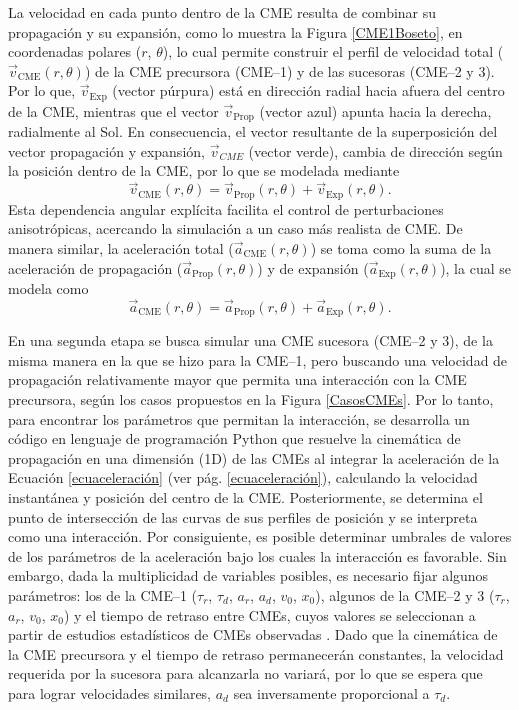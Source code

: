 La velocidad en cada punto dentro de la CME resulta de combinar su propagación y su expansión, como lo muestra la Figura \ref{CME1Boseto}, en coordenadas polares ($r$, $\theta$), lo cual permite construir el perfil de velocidad total ($\vec{v}_{\text{CME}}(r,\theta)$) de la CME precursora (CME--1) y de las sucesoras (CME--2 y 3). Por lo que, $\vec{v}_{\text{Exp}}$ (vector púrpura) está en dirección radial hacia afuera del centro de la CME, mientras que el vector $\vec{v}_{\text{Prop}}$ (vector azul) apunta hacia la derecha, radialmente al Sol. En consecuencia, el vector resultante de la superposición del vector propagación y expansión, $\vec{v}_{CME}$ (vector verde), cambia de dirección según la posición dentro de la CME, por lo que se modelada mediante
\begin{equation*}
\vec{v}_{\text{CME}}(r,\theta)=\vec{v}_{\text{Prop}}(r,\theta)+\vec{v}_{\text{Exp}}(r,\theta).
\end{equation*}
Esta dependencia angular explícita facilita el control de perturbaciones anisotrópicas, acercando la simulación a un caso más realista de CME. De manera similar, la aceleración total ($\vec{a}_{\text{CME}}(r,\theta)$) se toma como la suma de la aceleración de propagación ($\vec{a}_{\text{Prop}}(r,\theta)$) y de expansión ($\vec{a}_{\text{Exp}}(r,\theta)$), la cual se modela como
\begin{equation*}
\vec{a}_{\text{CME}}(r,\theta)=\vec{a}_{\text{Prop}}(r,\theta)+\vec{a}_{\text{Exp}}(r,\theta).
\end{equation*}

En una segunda etapa se busca simular una CME sucesora (CME--2 y 3), de la misma manera en la que se hizo para la CME--1, pero buscando una velocidad de propagación relativamente mayor que permita una interacción con la CME precursora, según los casos propuestos en la Figura \ref{CasosCMEs}. Por lo tanto, para encontrar los parámetros que permitan la interacción, se desarrolla un código en lenguaje de programación Python que resuelve la cinemática de propagación en una dimensión (1D) de las CMEs al integrar la aceleración de la Ecuación \eqref{ecuaceleración} (ver pág. \ref{ecuaceleración}), calculando la velocidad instantánea y posición del centro de la CME. Posteriormente, se determina el punto de intersección de las curvas de sus perfiles de posición y se interpreta como una interacción. Por consiguiente, es posible determinar umbrales de valores de los parámetros de la aceleración bajo los cuales la interacción es favorable. Sin embargo, dada la multiplicidad de variables posibles, es necesario fijar algunos parámetros: los de la CME--1 ($\tau_r$, $\tau_d$, $a_r$, $a_d$, $v_0$, $x_0$), algunos de la CME--2 y 3 ($\tau_r$, $a_r$, $v_0$, $x_0$) y el tiempo de retraso entre CMEs, cuyos valores se seleccionan a partir de estudios estadísticos de CMEs observadas \parencite[e.g.,][]{aschwanden-2019, ravishankar-2020}. Dado que la cinemática de la \ac{CME} precursora y el tiempo de retraso permanecerán constantes, la velocidad requerida por la sucesora para alcanzarla no variará, por lo que se espera que para lograr velocidades similares, $a_d$ sea inversamente proporcional a $\tau_d$.


